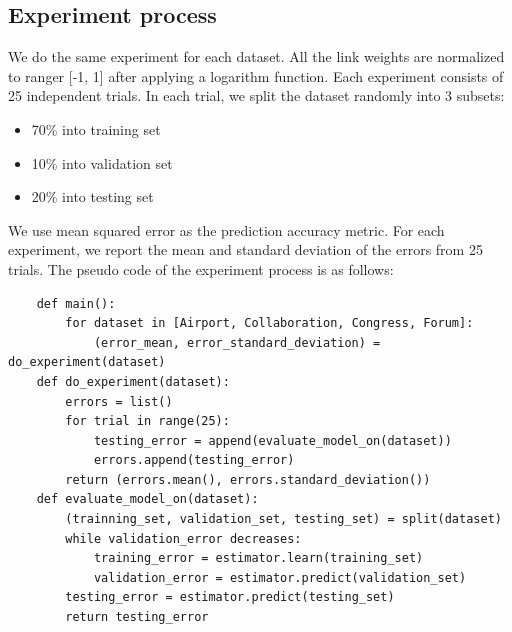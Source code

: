 \documentclass[letterpaper]{article}
\begin{document}
\subsection{Experiment process}
We do the same experiment for each dataset.
All the link weights are normalized to ranger [-1, 1] after applying a logarithm function.
Each experiment consists of 25 independent trials.
In each trial, we split the dataset randomly into 3 subsets:
\begin{itemize}
	\item 70\% into training set
	\item 10\% into validation set
	\item 20\% into testing set
\end{itemize}
We use mean squared error as the prediction accuracy metric.
For each experiment, we report the mean and standard deviation of the errors from 25 trials.
The pseudo code of the experiment process is as follows:

\begin{lstlisting}
	def main():
		for dataset in [Airport, Collaboration, Congress, Forum]:
			(error_mean, error_standard_deviation) = do_experiment(dataset)
	def do_experiment(dataset):
		errors = list()
		for trial in range(25):
			testing_error = append(evaluate_model_on(dataset))
			errors.append(testing_error)
		return (errors.mean(), errors.standard_deviation())
	def evaluate_model_on(dataset):
		(trainning_set, validation_set, testing_set) = split(dataset)
		while validation_error decreases:
			training_error = estimator.learn(training_set)
			validation_error = estimator.predict(validation_set)
		testing_error = estimator.predict(testing_set)
		return testing_error
\end{lstlisting}
\end{document}
